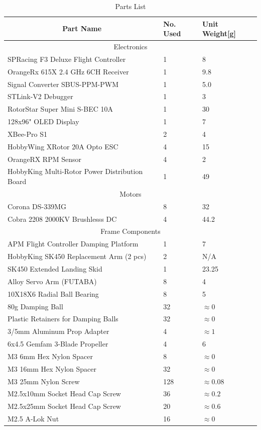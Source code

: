 \begin{table}[htbp]
\centering
\begin{tabularx}{\textwidth}{|X|l|l|}
\hline
\multicolumn{1}{|c|}{Part Name} & No. Used & Unit Weight[g]\\ \hline
\multicolumn{3}{|c|}{Electronics}\\ \hline
SPRacing F3 Deluxe Flight Controller & 1 & 8\\ \hline
OrangeRx 615X 2.4 GHz 6CH Receiver & 1 & 9.8\\ \hline
Signal Converter SBUS-PPM-PWM & 1 & 5.0\\ \hline 
STLink-V2 Debugger & 1 & 3\\ \hline
RotorStar Super Mini S-BEC 10A & 1 & 30\\ \hline
128x96" OLED Display & 1 & 7 \\ \hline
XBee-Pro S1 & 2 & 4 \\ \hline
HobbyWing XRotor 20A Opto ESC & 4 & 15\\ \hline
OrangeRX RPM Sensor & 4 & 2\\ \hline
HobbyKing Multi-Rotor Power Distribution Board & 1 & 49\\ \hline
\multicolumn{3}{|c|}{Motors}\\ \hline
Corona DS-339MG & 8 & 32\\ \hline
Cobra 2208 2000KV Brushlesss DC & 4 & 44.2\\ \hline
\multicolumn{3}{|c|}{Frame Components}\\ \hline
APM Flight Controller Damping Platform & 1 & 7\\ \hline
HobbyKing SK450 Replacement Arm (2 pcs) & 2 & N/A\\ \hline
SK450 Extended Landing Skid & 1 & 23.25\\ \hline
Alloy Servo Arm (FUTABA) & 8 & 4\\ \hline
10X18X6 Radial Ball Bearing & 8 & 5\\ \hline
80g Damping Ball & 32 & $\approx 0$\\ \hline
Plastic Retainers for Damping Balls & 32 & $\approx 0$\\ \hline
3/5mm Aluminum Prop Adapter & 4 & $\approx 1$\\ \hline
6x4.5 Gemfam 3-Blade Propeller & 4 & 6\\ \hline
M3 6mm Hex Nylon Spacer & 8 & $\approx 0$\\ \hline
M3 16mm Hex Nylon Spacer & 32 & $\approx 0$\\ \hline
M3 25mm Nylon Screw & 128 & $\approx 0.08$\\ \hline
M2.5x10mm Socket Head Cap Screw & 36 & $\approx 0.2$\\ \hline
M2.5x25mm Socket Head Cap Screw & 20 & $\approx 0.6$\\ \hline
M2.5 A-Lok Nut & 16 & $\approx 0$\\ \hline 
\end{tabularx}
\label{tab:partslist}
\caption{Parts List}
\end{table}

